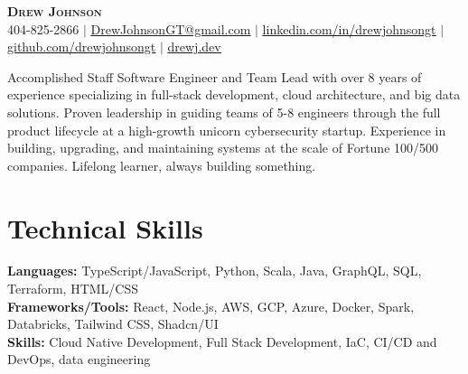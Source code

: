 \documentclass[letterpaper,11pt]{article}
\newcommand{\overviewSection}[1]{%
  \begin{center}
    \small #1 \par
  \end{center}
}
\begin{document}

\begin{center}
	\textbf{\Huge \scshape Drew Johnson} \\ \vspace{1pt}
	\small 404-825-2866 $|$ \href{mailto:x@x.com}{\underline{DrewJohnsonGT@gmail.com}} $|$ 
	\href{https://linkedin.com/in/drewjohnsongt}{\underline{linkedin.com/in/drewjohnsongt}} $|$
	\href{https://github.com/drewjohnsongt}{\underline{github.com/drewjohnsongt}} $|$
	\href{https://drewj.dev/}{\underline{drewj.dev}}
\end{center}


\overviewSection {Accomplished Staff Software Engineer and Team Lead with over 8 years of experience specializing in full-stack development, cloud architecture, and big data solutions. Proven leadership in guiding teams of 5-8 engineers through the full product lifecycle at a high-growth unicorn cybersecurity startup. Experience in building, upgrading, and maintaining systems at the scale of Fortune 100/500 companies. Lifelong learner, always building something.}

\section{Technical Skills}
\begin{itemize}[leftmargin=0.15in, label={}]
	\small{\item{
		\textbf{Languages:}{ TypeScript/JavaScript, Python, Scala, Java, GraphQL, SQL, Terraform, HTML/CSS} \\
		\textbf{Frameworks/Tools:}{ React, Node.js, AWS, GCP, Azure, Docker, Spark, Databricks, Tailwind CSS, Shadcn/UI} \\
		\textbf{Skills:}{ Cloud Native Development, Full Stack Development, IaC, CI/CD and DevOps, data engineering}
        }}
\end{itemize}
 
\end{document}

